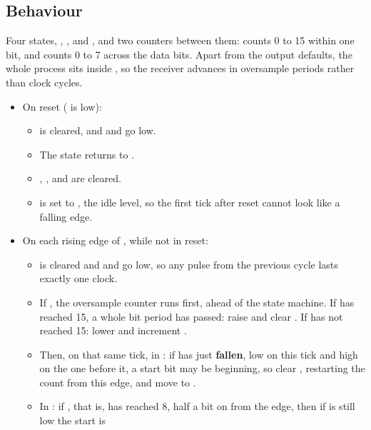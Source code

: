 \subsection{Behaviour}
\label{c3:sec:uart_rx_behaviour}
Four states, , ,  and , and two
counters between them:  counts 0 to 15 within one bit, and  counts 0 to 7
across the data bits. Apart from the output defaults, the whole process sits inside
, so the receiver advances in oversample periods rather than clock cycles.
\begin{itemize}
  \item On reset ( is low):
  \begin{itemize}
    \item {} is cleared, and  and  go low.
    \item The state returns to .
    \item {}, ,  and  are cleared.
    \item {} is set to , the idle level, so the first tick after reset cannot
      look like a falling edge.
  \end{itemize}
  \item On each rising edge of , while not in reset:
  \begin{itemize}
    \item {} is cleared and  and  go low, so any pulse from
      the previous cycle lasts exactly one clock.
    \item If , the oversample counter runs first, ahead of the state machine.
      If  has reached 15, a whole bit period has passed: raise  and
      clear . If  has not reached 15: lower  and increment
      .
    \item Then, on that same tick, in \textbf{}: if  has just
      \textbf{fallen}, low on this tick and high on the one before it, a start bit may be beginning,
      so clear , restarting the count from this edge, and move to .
    \item In \textbf{}: if , that is, 
      has reached 8, half a bit on from the edge, then if  is still low the start is

\end{itemize}
\end{itemize}
